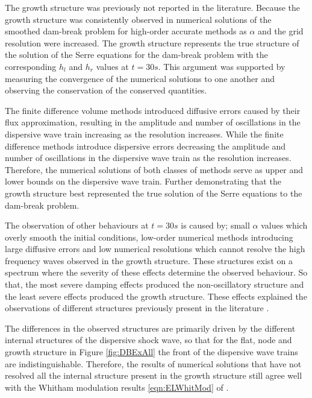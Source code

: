 The growth structure was previously not reported in the literature. Because the growth structure was consistently observed in numerical solutions of the smoothed dam-break problem for high-order accurate methods as $\alpha$ and the grid resolution were increased. The growth structure represents the true structure of the solution of the Serre equations for the dam-break problem with the corresponding $h_l$ and $h_r$ values at $t=30s$. This argument was supported by measuring the convergence of the numerical solutions to one another and observing the conservation of the conserved quantities. 

The finite difference volume methods introduced diffusive errors caused by their flux approximation, resulting in the amplitude and number of oscillations in the dispersive wave train increasing as the resolution increases. While the finite difference methods introduce dispersive errors decreasing the amplitude and number of oscillations in the dispersive wave train as the resolution increases. Therefore, the numerical solutions of both classes of methods serve as upper and lower bounds on the dispersive wave train. Further demonstrating that the growth structure best represented the true solution of the Serre equations to the dam-break problem. 

The observation of other behaviours at $t=30s$ is caused by; small $\alpha$ values which overly smooth the initial conditions, low-order numerical methods introducing large diffusive errors and low numerical resolutions which cannot resolve the high frequency waves observed in the growth structure. These structures exist on a spectrum where the severity of these effects determine the observed behaviour. So that, the most severe damping effects produced the non-oscillatory structure and the least severe effects produced the growth structure. These effects explained the observations of different structures previously present in the literature \cite{El-etal-2006,Hank-etal-2010-2034,Mitsotakis-etal-2014,Mitsotakis-etal-2017}. 

The differences in the observed structures are primarily driven by the different internal structures of the dispersive shock wave, so that for the flat, node and growth structure in Figure \ref{fig:DBExAll} the front of the dispersive wave trains are indistinguishable. Therefore, the results of numerical solutions that have not resolved all the internal structure present in the growth structure still agree well with the Whitham modulation results \eqref{eqn:ELWhitMod} of \citet{El-etal-2006}.

